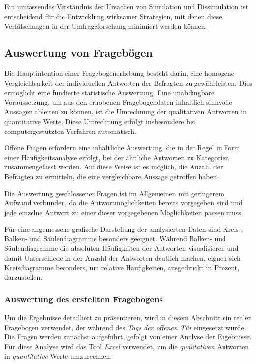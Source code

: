 Ein umfassendes Verständnis der Ursachen von Simulation und Dissimulation ist entscheidend für die Entwicklung wirksamer
Strategien, mit denen diese Verfälschungen in der Umfrageforschung minimiert werden können.

\subsection{Auswertung von Fragebögen}
Die Hauptintention einer Fragebogenerhebung besteht darin, eine homogene Vergleichbarkeit der individuellen Antworten der
Befragten zu gewährleisten. Dies ermöglicht eine fundierte statistische Auswertung. Eine unabdingbare Voraussetzung, um
aus den erhobenen Fragebogendaten inhaltlich sinnvolle Aussagen ableiten zu können, ist die Umrechnung der qualitativen
Antworten in quantitative Werte. Diese Umrechnung erfolgt insbesondere bei computergestützten Verfahren automatisch.

Offene Fragen erfordern eine inhaltliche Auswertung, die in der Regel in Form einer Häufigkeitsanalyse erfolgt, bei der
ähnliche Antworten zu Kategorien zusammengefasst werden. Auf diese Weise ist es möglich, die Anzahl der Befragten zu
ermitteln, die eine vergleichbare Aussage getroffen haben.

Die Auswertung geschlossener Fragen ist im Allgemeinen mit geringerem Aufwand verbunden, da die Antwortmöglichkeiten
bereits vorgegeben sind und jede einzelne Antwort zu einer dieser vorgegebenen Möglichkeiten passen muss.

Für eine angemessene grafische Darstellung der analysierten Daten sind Kreis-, Balken- und Säulendiagramme besonders
geeignet. Während Balken- und Säulendiagramme die absoluten Häufigkeiten der Antworten visualisieren und damit Unterschiede
in der Anzahl der Antworten deutlich machen, eignen sich Kreisdiagramme besonders, um relative Häufigkeiten, ausgedrückt
in Prozent, darzustellen.

\subsubsection{Auswertung des erstellten Fragebogens}
Um die Ergebnisse detailliert zu präsentieren, wird in diesem Abschnitt ein realer Fragebogen verwendet, der während des
\textit{Tags der offenen Tür} eingesetzt wurde. Die Fragen werden zunächst aufgeführt, gefolgt von einer Analyse der
Ergebnisse. Für diese Analyse wird das Tool \textit{Excel} verwendet, um die \textit{qualitativen} Antworten in \textit{quantitative}
Werte umzurechnen.

